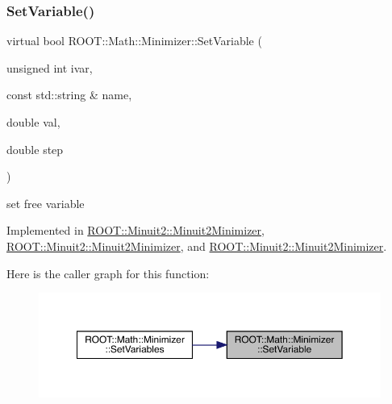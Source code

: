 \subsubsection{\texorpdfstring{SetVariable()}{SetVariable()}\hspace{0.1cm}{\footnotesize\ttfamily [1/3]}}
{\footnotesize\ttfamily virtual bool R\+O\+O\+T\+::\+Math\+::\+Minimizer\+::\+Set\+Variable (\begin{DoxyParamCaption}\item[{unsigned int}]{ivar,  }\item[{const std\+::string \&}]{name,  }\item[{double}]{val,  }\item[{double}]{step }\end{DoxyParamCaption})\hspace{0.3cm}{\ttfamily [pure virtual]}}



set free variable 



Implemented in \mbox{\hyperlink{classROOT_1_1Minuit2_1_1Minuit2Minimizer_a951ad856f74ded3c64836fa28fdf9bb5}{R\+O\+O\+T\+::\+Minuit2\+::\+Minuit2\+Minimizer}}, \mbox{\hyperlink{classROOT_1_1Minuit2_1_1Minuit2Minimizer_a951ad856f74ded3c64836fa28fdf9bb5}{R\+O\+O\+T\+::\+Minuit2\+::\+Minuit2\+Minimizer}}, and \mbox{\hyperlink{classROOT_1_1Minuit2_1_1Minuit2Minimizer_a951ad856f74ded3c64836fa28fdf9bb5}{R\+O\+O\+T\+::\+Minuit2\+::\+Minuit2\+Minimizer}}.

Here is the caller graph for this function\+:
\nopagebreak
\begin{figure}[H]
\begin{center}
\leavevmode
\includegraphics[width=350pt]{dc/dc4/classROOT_1_1Math_1_1Minimizer_a8661a2ac86372602f32f97b3d9262421_icgraph}
\end{center}
\end{figure}
\mbox{\label{classROOT_1_1Math_1_1Minimizer_a8661a2ac86372602f32f97b3d9262421}} 
